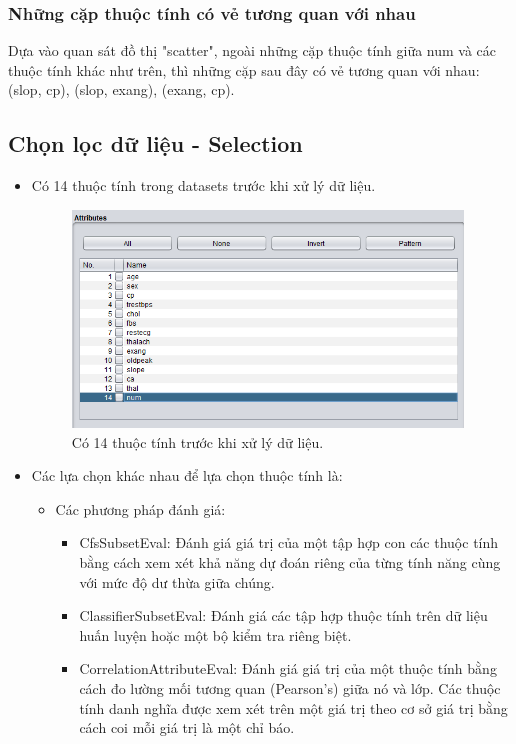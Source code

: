 \subsubsection{Những cặp thuộc tính có vẻ tương quan với nhau}
Dựa vào quan sát đồ thị "scatter", ngoài những cặp thuộc tính giữa num và các thuộc tính khác như trên, thì những cặp sau đây có vẻ tương quan với nhau: (slop, cp), (slop, exang), (exang, cp).


\subsection{Chọn lọc dữ liệu - Selection}
\begin{itemize}
	\item Có 14 thuộc tính trong datasets trước khi xử lý dữ liệu.
	\begin{figure}[H]
\centering
\includegraphics[width=0.98\textwidth]{3/1.png}
\caption{Có 14 thuộc tính trước khi xử lý dữ liệu.}
\end{figure}
\item Các lựa chọn khác nhau để lựa chọn thuộc tính là:
\begin{itemize}
	\item Các phương pháp đánh giá:
	\begin{itemize}
		\item CfsSubsetEval: Đánh giá giá trị của một tập hợp con các thuộc tính bằng cách xem xét khả năng dự đoán riêng của từng tính năng cùng với mức độ dư thừa giữa chúng.
		\item ClassifierSubsetEval: Đánh giá các tập hợp thuộc tính trên dữ liệu huấn luyện hoặc một bộ kiểm tra riêng biệt.
		\item CorrelationAttributeEval: Đánh giá giá trị của một thuộc tính bằng cách đo lường mối tương quan (Pearson's) giữa nó và lớp. Các thuộc tính danh nghĩa được xem xét trên một giá trị theo cơ sở giá trị bằng cách coi mỗi giá trị là một chỉ báo.

\end{itemize}
\end{itemize}
\end{itemize}
